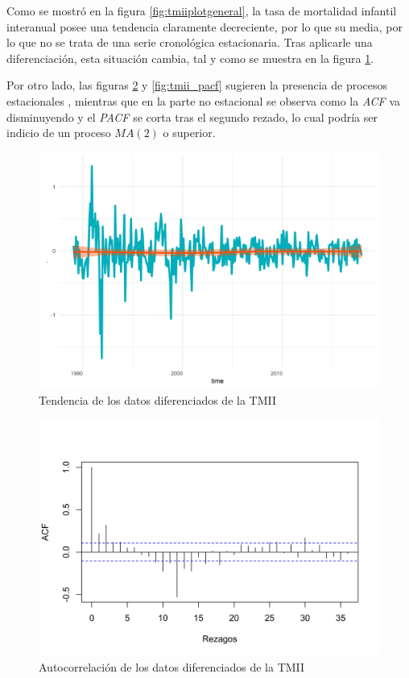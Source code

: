 \documentclass[
]{article}
\begin{document}
Como se mostró en la figura \ref{fig:tmiiplotgeneral}, la tasa de
mortalidad infantil interanual posee una tendencia claramente
decreciente, por lo que su media, por lo que no se trata de una serie
cronológica estacionaria. Tras aplicarle una diferenciación, esta
situación cambia, tal y como se muestra en la figura
\ref{fig:tmii_comportamiento}.

Por otro lado, las figuras \ref{fig:tmii_acf} y \ref{fig:tmii_pacf}
sugieren la presencia de procesos estacionales , mientras que en la
parte no estacional se observa como la \emph{ACF} va disminuyendo y el
\emph{PACF} se corta tras el segundo rezado, lo cual podría ser indicio
de un proceso \(MA(2)\) o superior.

\begin{figure}[H]
\includegraphics[width=1\linewidth,height=1\textheight]{Tesis_files/figure-latex/tmii_comportamiento-1} \caption{Tendencia de los datos diferenciados de la TMII}\label{fig:tmii_comportamiento}
\end{figure}

\begin{figure}[H]
\includegraphics[width=1\linewidth,height=1\textheight]{Tesis_files/figure-latex/tmii_acf-1} \caption{Autocorrelación de los datos diferenciados de la TMII}\label{fig:tmii_acf}
\end{figure}
\end{document}
